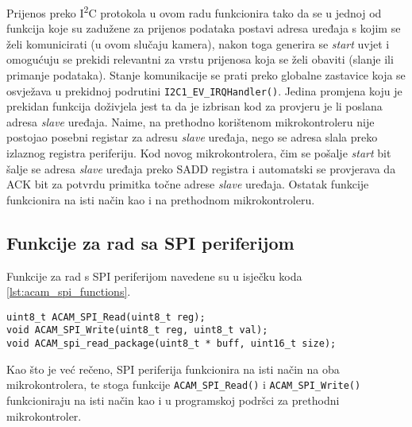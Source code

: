 Prijenos preko I\textsuperscript{2}C protokola u ovom radu funkcionira tako da se u jednoj od funkcija koje su zadužene za prijenos podataka postavi adresa uređaja s kojim se želi komunicirati (u ovom slučaju kamera), nakon toga generira se \textit{start} uvjet i omogućuju se prekidi relevantni za vrstu prijenosa koja se želi obaviti (slanje ili primanje podataka). Stanje komunikacije se prati preko globalne zastavice koja se osvježava u prekidnoj podrutini \verb|I2C1_EV_IRQHandler()|. Jedina promjena koju je prekidan funkcija doživjela jest ta da je izbrisan kod za provjeru je li poslana adresa \textit{slave} uređaja. Naime, na prethodno korištenom mikrokontroleru nije postojao posebni registar za adresu \textit{slave} uređaja, nego se adresa slala preko izlaznog registra periferiju. Kod novog mikrokontrolera, čim se pošalje \textit{start} bit šalje se adresa \textit{slave} uređaja preko SADD registra i automatski se provjerava da ACK bit za potvrdu primitka točne adrese \textit{slave} uređaja. Ostatak funkcije funkcionira na isti način kao i na prethodnom mikrokontroleru.

\subsection{Funkcije za rad sa SPI periferijom}

Funkcije za rad s SPI periferijom navedene su u isječku koda \ref{lst:acam_spi_functions}.

\begin{lstlisting}[caption=Funkcije za rad s SPI periferijom, label={lst:acam_spi_functions}]
uint8_t ACAM_SPI_Read(uint8_t reg);
void ACAM_SPI_Write(uint8_t reg, uint8_t val);
void ACAM_spi_read_package(uint8_t * buff, uint16_t size);
\end{lstlisting}

\noindent Kao što je već rečeno, SPI periferija funkcionira na isti način na oba mikrokontrolera, te stoga funkcije \verb|ACAM_SPI_Read()| i \verb|ACAM_SPI_Write()| funkcioniraju na isti način kao i u programskoj podršci za prethodni mikrokontroler.

